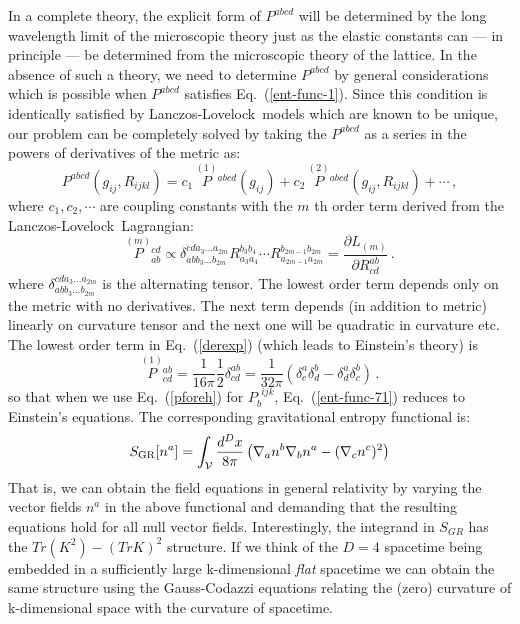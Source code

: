 \documentclass[12pt]{iopart}
\def\eq#1{{Eq.~(\ref{#1})}}
\newcommand{\LL}{Lanczos-Lovelock}
\newcommand{\Cal}[1]{\ensuremath{\mathcal{#1}}}
\newcommand{\ph}[1]{\phantom{#1}}
\newcommand{\D}{\ensuremath{\nabla}}
\newcommand{\AltC}[8]{\ensuremath{\delta^{#1 #2 #3... #4}_{#5 #6 #7
      ... #8}}}
\newcommand{\Riem}[4]{\ensuremath{R^{#1 #2}_{#3 #4}}}
\newcommand{\LDm}{\ensuremath{L_{(m)}}}
\begin{document}
In a
complete theory, the explicit form of $P^{abcd}$ will be determined by the
long wavelength limit of the microscopic theory just as the elastic
constants can --- in principle --- be determined from the microscopic
theory of the lattice. 
In the absence of such a theory, we need to determine $P^{abcd}$ by general considerations which is possible when $P^{abcd}$ satisfies \eq{ent-func-1}.
Since this condition is identically satisfied by \LL\ models which are known to be unique, our problem can be completely solved by taking the  $P^{abcd}$  as a series in the
 powers of  derivatives of
the metric as:
\begin{equation}
P^{abcd} (g_{ij},R_{ijkl}) = c_1\,\stackrel{(1)}{P}{}^{abcd} (g_{ij}) +
c_2\, \stackrel{(2)}{P}{}^{abcd} (g_{ij},R_{ijkl})  
+ \cdots \,,
\label{derexp}
\end{equation} 
where $c_1, c_2, \cdots$ are coupling constants with the $m$ th order term derived from the \LL\ Lagrangian:
\begin{equation}
\stackrel{(m)}{P}{}_{ab}^{cd}\propto
\AltC{c}{d}{a_3}{a_{2m}}{a}{b}{b_3}{b_{2m}}
\Riem{b_3}{b_4}{a_3}{a_4} \cdots
\Riem{b_{2m-1}}{b_{2m}}{a_{2m-1}}{a_{2m}} 
 =
\frac{\partial\LDm}{\partial R^{ab}_{{cd}}}\,. 
\label{zerothree}
\end{equation}
where $\AltC{c}{d}{a_3}{a_{2m}}{a}{b}{b_3}{b_{2m}}$ is the alternating tensor.
 The lowest order
term depends only on the metric with no derivatives. The next
term depends (in addition to metric) linearly on curvature tensor and the next one will be quadratic in curvature etc.
The lowest order term in \eq{derexp} (which  leads to Einstein's theory) is
\begin{equation}
\stackrel{(1)}{P}{}^{ab}_{cd}=\frac{1}{16\pi}
\frac{1}{2} \delta^{ab}_{cd} =\frac{1}{32\pi}
(\delta^a_c \delta^b_d-\delta^a_d \delta^b_c)
  \,.
\label{pforeh}
\end{equation}
so that when we use \eq{pforeh} for $P_{b}^{\ph{b}ijk}$, 
   \eq{ent-func-71} 
 reduces to Einstein's equations.
 The corresponding gravitational entropy functional
is:
 \begin{equation}
S_{\rm GR}[n^a]=\int_\Cal{V}\frac{d^Dx}{8\pi}
   \left(\D_an^b\D_bn^a - (\D_cn^c)^2 \right)
\end{equation}
That is, we can obtain the field equations in general relativity by varying
the vector fields $n^a$ in the above functional and demanding that the resulting equations hold for all null vector fields. 
 Interestingly, the integrand in $S_{GR}$ has the $Tr(K^2)-(Tr K)^2$ structure. If we think of the $D=4$ spacetime being embedded in a sufficiently large k-dimensional \textit{flat} spacetime we can obtain the same structure using the Gauss-Codazzi equations relating the (zero) curvature of k-dimensional space with the curvature of spacetime.
\end{document}
